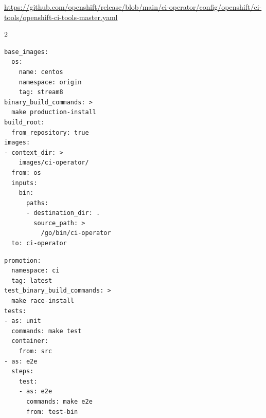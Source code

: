 \begin{frame}[fragile]
    \autotitle
    \footnotesize
    \url{https://github.com/openshift/release/blob/main/ci-operator/config/openshift/ci-tools/openshift-ci-tools-master.yaml}
    \scriptsize
    \begin{multicols}{2}
    \begin{verbatim}
base_images:
  os:
    name: centos
    namespace: origin
    tag: stream8
binary_build_commands: >
  make production-install
build_root:
  from_repository: true
images:
- context_dir: >
    images/ci-operator/
  from: os
  inputs:
    bin:
      paths:
      - destination_dir: .
        source_path: >
          /go/bin/ci-operator
  to: ci-operator
  \end{verbatim}
  \columnbreak
  \begin{verbatim}
promotion:
  namespace: ci
  tag: latest
test_binary_build_commands: >
  make race-install
tests:
- as: unit
  commands: make test
  container:
    from: src
- as: e2e
  steps:
    test:
    - as: e2e
      commands: make e2e
      from: test-bin
    \end{verbatim} %
    \end{multicols}
\end{frame}
